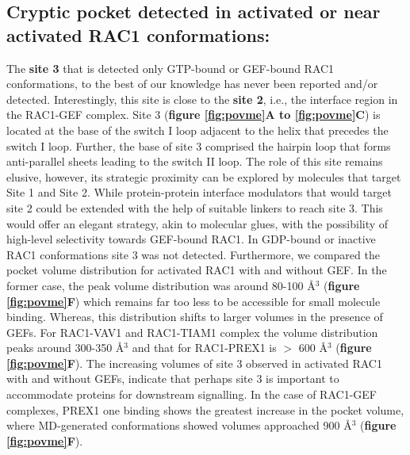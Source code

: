 \documentclass[12pt, a4paper]{achemso}
\begin{document}
\subsection{Cryptic pocket detected in activated or near activated RAC1 conformations:}
    The \textbf{site 3} that is detected only GTP-bound or GEF-bound RAC1 conformations, to the best of our knowledge has never been reported and/or detected. Interestingly, this site is close to the \textbf{site 2}, i.e., the interface region in the RAC1-GEF complex. Site 3 (\textbf{figure \ref{fig:povme}A to \ref{fig:povme}C}) is located at the base of the switch I loop adjacent to the helix that precedes the switch I loop. Further, the base of site 3 comprised the hairpin loop that forms anti-parallel sheets leading to the switch II loop. The role of this site remains elusive, however, its strategic proximity can be explored by molecules that target Site 1 and Site 2. While protein-protein interface modulators that would target site 2 could be extended with the help of suitable linkers to reach site 3. This would offer an elegant strategy, akin to molecular glues, with the possibility of high-level selectivity towards GEF-bound RAC1. In GDP-bound or inactive RAC1 conformations site 3 was not detected.  Furthermore, we compared the pocket volume distribution for activated RAC1 with and without GEF. In the former case, the peak volume distribution was around 80-100 {\r{A}$^3$} (\textbf{figure \ref{fig:povme}F}) which remains far too less to be accessible for small molecule binding. Whereas, this distribution shifts to larger volumes in the presence of GEFs. For RAC1-VAV1 and RAC1-TIAM1 complex the volume distribution peaks around 300-350 {\r{A}$^3$} and that for RAC1-PREX1 is $>$ 600 {\r{A}$^3$} (\textbf{figure \ref{fig:povme}F}). The increasing volumes of site 3 observed in activated RAC1 with and without GEFs, indicate that perhaps site 3 is important to accommodate proteins for downstream signalling. In the case of RAC1-GEF complexes, PREX1 one binding shows the greatest increase in the pocket volume, where MD-generated conformations showed volumes approached 900 {\r{A}$^3$} (\textbf{figure \ref{fig:povme}F}). 
    

\end{document}

